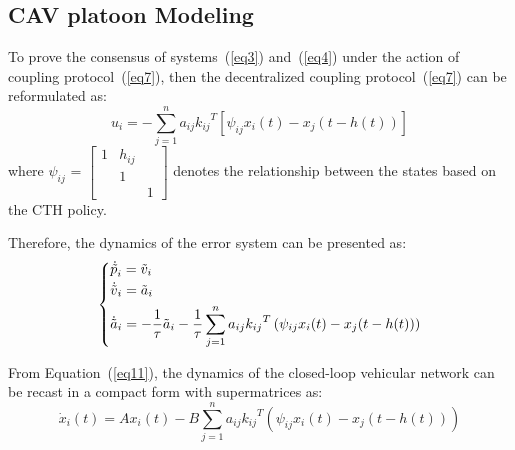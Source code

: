 \documentclass[a4paper]{cas-sc}
\begin{document}
\subsection{CAV platoon Modeling}
\label{Section 3.2}

To prove the consensus of systems~(\ref{eq3}) and~(\ref{eq4}) under the action of coupling protocol~(\ref{eq7}), then the decentralized coupling protocol~(\ref{eq7}) can be reformulated as:
\begin{equation}
  {u_i} =  - \sum\limits_{j = 1}^n {{a_{ij}}{k_{ij}}^T\left[ {{\psi _{ij}}{x_i}(t) - {x_j}(t - h(t))} \right]}
  \label{eq10}
\end{equation}
where $ {\psi _{ij}}{\text{ = }}\left[ {\begin{array}{*{20}{c}}
          1  & {{h_{ij}}} & {} \\
          {} & 1          & {} \\
          {} & {}         & 1
        \end{array}} \right] $ denotes the relationship between the states based on the CTH policy.

Therefore, the dynamics of the error system can be presented as:
\begin{equation}
  \left\{ \begin{gathered}
    {{\dot {\tilde p}}_i} = {{\tilde v}_i} \hfill \\
    {{\dot {\tilde v}}_i} = {{\tilde a}_i} \hfill \\
    {{\dot {\tilde a}}_i} =  - \frac{1}{\tau }{{\tilde a}_i} - \frac{1}{\tau }\sum\limits_{j = 1}^n {{a_{ij}}{k_{ij}}^T\left( {{\psi _{ij}}{x_i}(t) - {x_j}(t - h(t))} \right)}  \hfill \\
  \end{gathered}  \right.
  \label{eq11}
\end{equation}

From Equation~(\ref{eq11}), the dynamics of the closed-loop vehicular network can be recast in a compact form with supermatrices as:
\begin{equation}
  {\dot x_i}\left( t \right) = A{x_i}\left( t \right) - B\sum\limits_{j = 1}^n {{a_{ij}}{k_{ij}}^T\left( {{\psi _{ij}}{x_i}(t) - {x_j}(t - h(t))} \right)}
  \label{eq12}
\end{equation}
\end{document}
